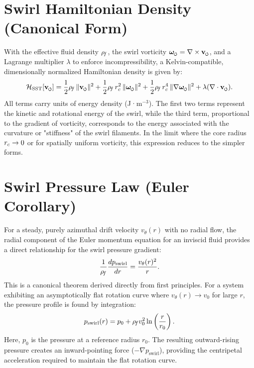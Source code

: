 \documentclass[11pt]{article}
\begin{document}
        \section{Swirl Hamiltonian Density (Canonical Form)}
        \label{sec:hamiltonian}
        With the effective fluid density \(\rho_{\!f}\), the swirl vorticity \(\omegas=\nabla\times \vswirl\), and a Lagrange multiplier \(\lambda\) to enforce incompressibility, a Kelvin-compatible, dimensionally normalized Hamiltonian density is given by:
        \begin{equation}
        \mathcal{H}_{\text{SST}}[\vswirl] = \frac{1}{2}\rhof\,\|\vswirl\|^2 + \frac{1}{2}\rhof\,\rc^2\,\|\omegas\|^2 + \frac{1}{2}\rhof\,\rc^4\,\|\nabla \omegas\|^2 + \lambda (\nabla\cdot \vswirl).
        \label{eq:Hamiltonian_SST}
        \end{equation}
        All terms carry units of energy density (J·m\(^{-3}\)). The first two terms represent the kinetic and rotational energy of the swirl, while the third term, proportional to the gradient of vorticity, corresponds to the energy associated with the curvature or "stiffness" of the swirl filaments. In the limit where the core radius \(r_c\to 0\) or for spatially uniform vorticity, this expression reduces to the simpler forms.

        \section{Swirl Pressure Law (Euler Corollary)}
        \label{sec:darkpressure}
        For a steady, purely azimuthal drift velocity $v_\theta(r)$ with no radial flow, the radial component of the Euler momentum equation for an inviscid fluid provides a direct relationship for the swirl pressure gradient:
        \begin{equation}
        \frac{1}{\rho_{\!f}}\frac{dp_{\text{swirl}}}{dr} = \frac{v_\theta(r)^2}{r}.
        \label{eq:swirl_pressure_law}
        \end{equation}
        This is a canonical theorem derived directly from first principles. For a system exhibiting an asymptotically flat rotation curve where $v_\theta(r) \to v_0$ for large $r$, the pressure profile is found by integration:
        \begin{equation}
        p_{\text{swirl}}(r) = p_0 + \rho_{\!f} v_0^2 \ln\left(\frac{r}{r_0}\right).
        \end{equation}
        Here, $p_0$ is the pressure at a reference radius $r_0$. The resulting outward-rising pressure creates an inward-pointing force ($-\nabla p_{\text{swirl}}$), providing the centripetal acceleration required to maintain the flat rotation curve.
\end{document}
